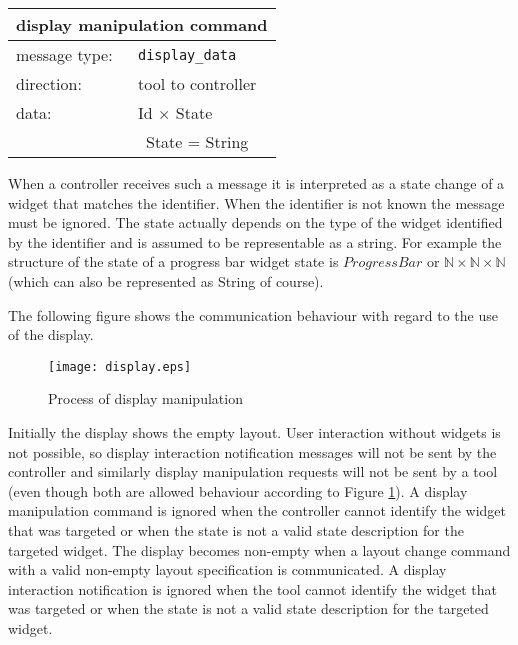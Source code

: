 \documentclass{article}
\newcommand{\msg}[1]{\texttt{#1}}
\begin{document}
   \begin{table}[H]
    \begin{center}
     \begin{tabular}{|ll|}
      \hline
       \multicolumn{2}{|l|}{\textbf{display manipulation command}} \\
      \hline
       message type:   & \msg{display\_data} \\
      \hline
       direction:      & tool to controller \\
       data:           & Id $\times$ State \\
                       & \ State = String \\
      \hline
     \end{tabular}
    \end{center}
   \vspace{-0.4cm}
   \end{table}

   \noindent When a controller receives such a message it is interpreted as a
   state change of a widget that matches the identifier. When the identifier is
   not known the message must be ignored. The state actually depends on the
   type of the widget identified by the identifier and is assumed to be
   representable as a string.  For example the structure of the state of a
   progress bar widget state is $ProgressBar$ or $\mathbb{N} \times \mathbb{N}
   \times \mathbb{N}$ (which can also be represented as String of course).


   The following figure shows the communication behaviour with regard to the
   use of the display.
   
   \begin{figure}[H]
    \begin{center}
     \texttt{[image: display.eps]}
    \end{center}
    \vspace{-0.4cm}
    \caption{Process of display manipulation}
    \label{figure:display_manipulation}
   \end{figure}

   \noindent Initially the display shows the empty layout. User interaction
   without widgets is not possible, so display interaction notification
   messages will not be sent by the controller and similarly display
   manipulation requests will not be sent by a tool (even though both are
   allowed behaviour according to Figure \ref{figure:display_manipulation}). A
   display manipulation command is ignored when the controller cannot identify
   the widget that was targeted or when the state is not a valid state
   description for the targeted widget. The display becomes non-empty when a
   layout change command with a valid non-empty layout specification is
   communicated.  A display interaction notification is ignored when the tool
   cannot identify the widget that was targeted or when the state is not a
   valid state description for the targeted widget. 
   
\end{document}
